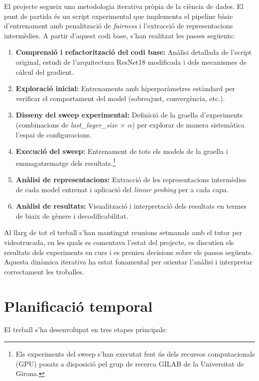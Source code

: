 \documentclass[a4paper,12pt,twoside]{ThesisStyle}
\begin{document}
El projecte segueix una metodologia iterativa pròpia de la ciència de dades. El punt de partida és un script experimental que implementa el pipeline bàsic d'entrenament amb penalització de \textit{fairness} i l'extracció de representacions intermèdies. A partir d'aquest codi base, s'han realitzat les passes següents:

\begin{enumerate}
    \item \textbf{Comprensió i refactorització del codi base:} Anàlisi detallada de l'script original, estudi de l'arquitectura ResNet18 modificada i dels mecanismes de càlcul del gradient.
    \item \textbf{Exploració inicial:} Entrenaments amb hiperparàmetres estàndard per verificar el comportament del model (sobreajust, convergència, etc.).
    \item \textbf{Disseny del sweep experimental:} Definició de la graella d'experiments (combinacions de \textit{last\_layer\_size} $\times$ $\alpha$) per explorar de manera sistemàtica l'espai de configuracions.
    \item \textbf{Execució del sweep:} Entrenament de tots els models de la graella i emmagatzematge dels resultats.\footnote{Els experiments del sweep s'han executat fent ús dels recursos computacionals (GPU) posats a disposició pel grup de recerca GILAB de la Universitat de Girona.}
    \item \textbf{Anàlisi de representacions:} Extracció de les representacions intermèdies de cada model entrenat i aplicació del \textit{linear probing} per a cada capa.
    \item \textbf{Anàlisi de resultats:} Visualització i interpretació dels resultats en termes de biaix de gènere i decodificabilitat.
\end{enumerate}

Al llarg de tot el treball s'han mantingut reunions setmanals amb el tutor per videotrucada, en les quals es comentava l'estat del projecte, es discutien els resultats dels experiments en curs i es prenien decisions sobre els passos següents. Aquesta dinàmica iterativa ha estat fonamental per orientar l'anàlisi i interpretar correctament les troballes.

\section{Planificació temporal}

El treball s'ha desenvolupat en tres etapes principals:
\end{document}

